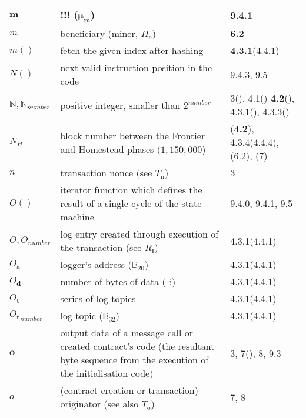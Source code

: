 \documentclass[9pt,oneside]{amsart}
\newcommand{\reff}[1]{{\footnotesize #1}}
\begin{document}
\begin{longtabu}{X[1.2lm] X[3] X}
$\mathbf{m}$ &
!!! ($\boldsymbol{\mu}_{\mathbf{m}}$) &
\reff{9.4.1} \\\hline

$m$ &
beneficiary (miner, $H_{\mathrm{c}}$) &
\reff{\textbf{6.2}} \\\hline

$m()$ &
fetch the given index after hashing &
\reff{\textbf{4.3.1}(4.4.1)} \\\hline

$N()$ &
next valid instruction position in the code &
\reff{9.4.3, 9.5} \\\hline

$\mathbb{N}, \mathbb{N}_{number}$ &
positive integer, smaller than $2^{number}$ &
\reff{3(), 4.1() \textbf{4.2}(), 4.3.1(), 4.3.3()} \\\hline

$N_H$ &
block number between the Frontier and Homestead phases ($1,150,000$) &
\reff{(\textbf{4.2}), 4.3.4(4.4.4), (6.2), (7)} \\\hline

$n$ &
transaction nonce (see $T_{\mathrm{n}}$) &
\reff{3} \\\hline

$O()$ &
iterator function which defines the result of a single cycle of the state machine &
\reff{9.4.0, 9.4.1, 9.5} \\\hline

$O, O_{number}$ &
log entry created through execution of the transaction (see $R_{\mathbf{l}}$) &
\reff{4.3.1(4.4.1)} \\\hline

$O_{\mathrm{a}}$ &
logger's address ($\mathbb{B}_{20}$) &
\reff{4.3.1(4.4.1)} \\\hline

$O_{\mathbf{d}}$ &
number of bytes of data ($\mathbb{B}$) &
\reff{4.3.1(4.4.1)} \\\hline

$O_{\mathbf{t}}$ &
series of log topics &
\reff{4.3.1(4.4.1)} \\\hline

${O_{\mathbf{t}}}_{number}$ &
log topic ($\mathbb{B}_{32}$) &
\reff{4.3.1(4.4.1)} \\\hline

$\mathbf{o}$ &
output data of a message call or created contract's code (the resultant byte sequence from the execution of the initialisation code) &
\reff{3, 7(), 8, 9.3} \\\hline

$o$ &
(contract creation or transaction) originator (see also $T_{\mathrm{o}}$) &
\reff{7, 8} \\\hline


\end{longtabu}
\end{document}
